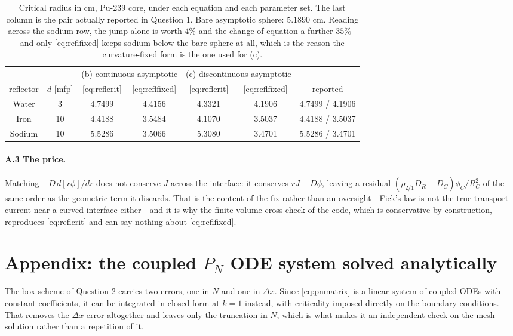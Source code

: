 {{\begin{table}[htbp]
\centering
\begin{tabular}{ccccccc}
\toprule
 & & \multicolumn{2}{c}{(b) continuous asymptotic} & \multicolumn{2}{c}{(c) discontinuous asymptotic} & \\
reflector & $d$ [mfp] & \eqref{eq:reflcrit} & \eqref{eq:reflfixed} & \eqref{eq:reflcrit} & \eqref{eq:reflfixed} & reported \\
\midrule
Water  & 3  & 4.7499 & 4.4156 & 4.3321 & 4.1906 & 4.7499 / 4.1906 \\
Iron   & 10 & 4.4188 & 3.5484 & 4.1070 & 3.5037 & 4.4188 / 3.5037 \\
Sodium & 10 & 5.5286 & 3.5066 & 5.3080 & 3.4701 & 5.5286 / 3.4701 \\
\bottomrule
\end{tabular}
\caption{Critical radius in cm, Pu-239 core, under each equation and each parameter set. The
last column is the pair actually reported in Question 1. Bare asymptotic sphere: $5.1890$ cm.
Reading across the sodium row, the jump alone is worth $4\%$ and the change of equation a further $35\%$ - and
only \eqref{eq:reflfixed} keeps sodium below the bare sphere at all, which is the reason the
curvature-fixed form is the one used for (c).}
\end{table}

\paragraph{A.3 The price.} Matching $-D\,d[r\phi]/dr$ does not conserve $J$ across the
interface: it conserves $rJ + D\phi$, leaving a residual
$\left(\rho_{2/1}D_R - D_C\right)\phi_C/R_C^2$ of the same order as the geometric term it
discards. That is the content of the fix rather than an oversight - Fick's law is not the
true transport current near a curved interface either - and it is why the finite-volume
cross-check of the code, which is conservative by construction, reproduces \eqref{eq:reflcrit}
and can say nothing about \eqref{eq:reflfixed}.
}

\section*{Appendix: the coupled $P_N$ ODE system solved analytically}

The box scheme of Question 2 carries two errors, one in $N$ and one in $\Delta x$. Since
\eqref{eq:pnmatrix} is a linear system of coupled ODEs with constant coefficients, it can be
integrated in closed form at $k=1$ instead, with criticality imposed directly on the boundary
conditions. That removes the $\Delta x$ error altogether and leaves only the truncation in $N$,
which is what makes it an independent check on the mesh solution rather than a repetition of
it.

}
